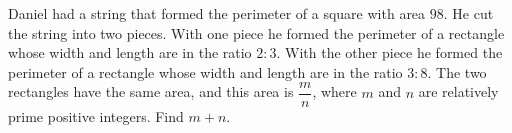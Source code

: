 Daniel had a string that formed the perimeter of a square with area $98$. He cut the string into two pieces. With one piece he formed the perimeter of a rectangle whose width and length are in the ratio $2:3$. With the other piece he formed the perimeter of a rectangle whose width and length are in the ratio $3:8$. The two rectangles have the same area, and this area is $\dfrac {m}{n}$, where $m$ and $n$ are relatively prime positive integers. Find $m+n$.
